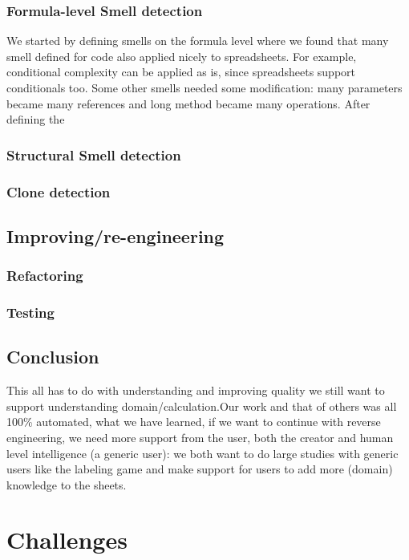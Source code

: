 \documentclass[conference]{IEEEtran}
\begin{document}
\subsubsection{Formula-level Smell detection}
We started by defining smells on the formula level where we found that many smell defined for code also applied nicely to spreadsheets. For example, conditional complexity can be applied as is, since spreadsheets support conditionals too. Some other smells needed some modification: many parameters became many references and long method became many operations. After defining the 

\subsubsection{Structural Smell detection}

\subsubsection{Clone detection}

\subsection{Improving/re-engineering}
\subsubsection{Refactoring}
\subsubsection{Testing}

\subsection{Conclusion}
This all has to do with understanding and improving quality we still want to support understanding domain/calculation.Our work and that of others was all 100\% automated, what we have learned, if we want to continue with reverse engineering, we need more support from the user, both the creator and human level intelligence (a generic user): we both want to do large studies with generic users like the labeling game and make support for users to add more (domain) knowledge to the sheets.

\section{Challenges} 
\end{document}
